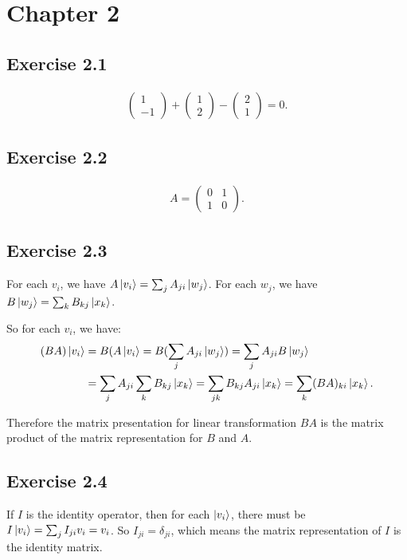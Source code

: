 \section*{Chapter 2}

\subsection*{Exercise 2.1}
\begin{align}
\left(\begin{array}{c}
1 \\
-1
\end{array}\right)+\left(\begin{array}{l}
1 \\
2
\end{array}\right)-\left(\begin{array}{l}
2 \\
1
\end{array}\right)=0.
\end{align}

\subsection*{Exercise 2.2}
\begin{align}
    A=\begin{pmatrix}0&1\\1&0\end{pmatrix}.
\end{align}

\subsection*{Exercise 2.3}

For each $v_i$, we have $A\ket{v_i}=\sum_j A_{ji}\ket{w_j}$. For each $w_j$, we have  $B\ket{w_j}=\sum_k B_{kj}\ket{x_k}$.

So for each $v_i$, we have:
\begin{align}
     (BA)\ket{v_i}&=B(A\ket{v_i}=B(\sum_j A_{ji}\ket{w_j})=\sum_j A_{ji}B\ket{w_j}\\
     &=\sum_j A_{ji}\sum_k B_{kj}\ket{x_k}=\sum_{jk} B_{kj} A_{ji}\ket{x_k}=\sum_k (BA)_{ki}\ket{x_k}.
\end{align}

Therefore the matrix presentation for linear transformation $BA$ is the matrix product of the matrix representation for $B$ and $A$.

\subsection*{Exercise 2.4}
 If $I$ is the identity operator, then for each $\ket{v_i}$, there must be $I\ket{v_i}=\sum_j I_{ji}v_i=v_i$. So $I_{ji}=\delta_{ji}$, which means the matrix representation of $I$ is the identity matrix.
 
